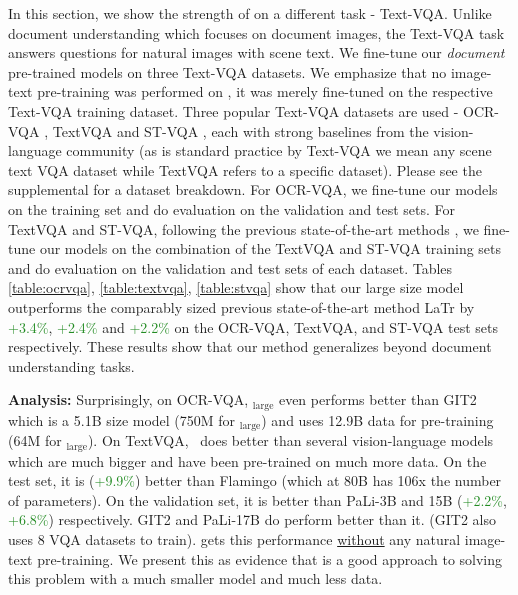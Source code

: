 \documentclass[10pt,twocolumn,letterpaper]{article}
\begin{document}
In this section, we show the strength of \papertitle on a different task - Text-VQA. Unlike document understanding which focuses on document images, the Text-VQA task answers questions for natural images with scene text. 
We fine-tune our \textit{document} pre-trained models on three Text-VQA datasets. We emphasize that no image-text pre-training was performed on \papertitlenospace, it was merely fine-tuned on the respective Text-VQA training dataset.
Three popular Text-VQA datasets are used - OCR-VQA \cite{mishra2019ocr}, TextVQA \cite{singh2019towards} and ST-VQA \cite{biten2019scene}, each with strong baselines from the vision-language community (as is standard practice by Text-VQA we mean any scene text VQA dataset while TextVQA refers to a specific dataset). Please see the supplemental for a dataset breakdown.
For OCR-VQA, we fine-tune our models on the training set and do evaluation on the validation and test sets. For TextVQA and ST-VQA, following the previous state-of-the-art methods \cite{biten2022latr,yang2021tap}, we fine-tune our models on the combination of the TextVQA and ST-VQA training sets and do evaluation on the validation and test sets of each dataset.
Tables \ref{table:ocrvqa}, \ref{table:textvqa}, \ref{table:stvqa} show that our large size model outperforms the comparably sized previous state-of-the-art method LaTr \cite{biten2022latr} by \textcolor{forestgreen}{+3.4\%}, \textcolor{forestgreen}{+2.4\%} and \textcolor{forestgreen}{+2.2\%} on the OCR-VQA, TextVQA, and ST-VQA test sets respectively.
These results show that our method  generalizes beyond document understanding tasks.

\textbf{Analysis:} Surprisingly, on OCR-VQA,  \papertitlenospace$_{\text{large}}$ even performs better than GIT2 \cite{wang2022git} which is a 5.1B size model (\vs 750M for \papertitlenospace$_{\text{large}}$) and uses 12.9B data for pre-training (\vs 64M for \papertitlenospace$_{\text{large}}$).
On TextVQA, \papertitlenospace \ does better than several vision-language models which are much bigger and have been pre-trained on much more data. On the test set, it is (\textcolor{forestgreen}{+9.9\%}) better than Flamingo (which at 80B has 106x the number of parameters). On the validation set, it is better than PaLi-3B and 15B (\textcolor{forestgreen}{+2.2\%}, \textcolor{forestgreen}{+6.8\%}) respectively. GIT2 and PaLi-17B do perform better than it. (GIT2 also uses 8 VQA datasets to train). \papertitle gets this performance \uline{without} any natural image-text pre-training. We present this as evidence that  \papertitle is a good approach to solving this problem with a much smaller model and much less data.
\end{document}
